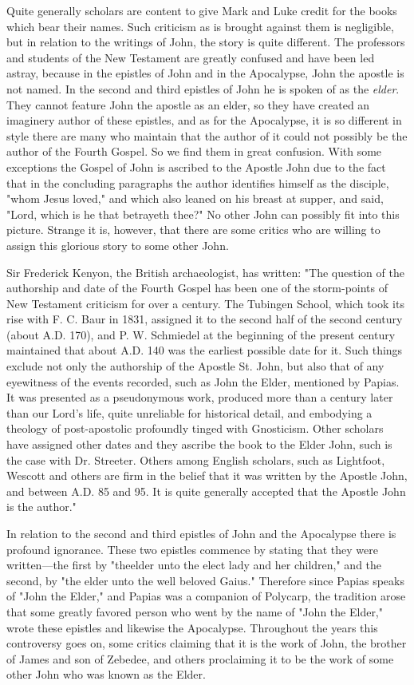 Quite generally scholars are content to give Mark and Luke credit for the books which bear
their names. Such criticism as is brought against them is negligible, but in relation to the
writings of John, the story is quite different. The professors and students of the New
Testament are greatly confused and have been led astray, because in the epistles of John and
in the Apocalypse, John the apostle is not named. In the second and third epistles of John he
is spoken of as the \textit{elder}. They cannot feature John the apostle as an elder, so they have
created an imaginery author of these epistles, and as for the Apocalypse, it is so different in
style there are many who maintain that the author of it could not possibly be the author of the
Fourth Gospel. So we find them in great confusion. With some exceptions the Gospel of John
is ascribed to the Apostle John due to the fact that in the concluding paragraphs the author
identifies himself as the disciple, "whom Jesus loved," and which also leaned on his breast at
supper, and said, "Lord, which is he that betrayeth thee?" No other John can possibly fit into
this picture. Strange it is, however, that there are some critics who are willing to assign this
glorious story to some other John.

Sir Frederick Kenyon, the British archaeologist, has written: "The question of the authorship
and date of the Fourth Gospel has been one of the storm-points of New Testament criticism
for over a century. The Tubingen School, which took its rise with F. C. Baur in 1831,
assigned it to the second half of the second century (about A.D. 170), and P. W. Schmiedel at
the beginning of the present century maintained that about A.D. 140 was the earliest possible
date for it. Such things exclude not only the authorship of the Apostle St. John, but also that
of any eyewitness of the events recorded, such as John the Elder, mentioned by Papias. It was
presented as a pseudonymous work, produced more than a century later than our Lord's life,
quite unreliable for historical detail, and embodying a theology of post-apostolic profoundly
tinged with Gnosticism. Other scholars have assigned other dates and they ascribe the book
to the Elder John, such is the case with Dr. Streeter. Others among English scholars, such as
Lightfoot, Wescott and others are firm in the belief that it was written by the Apostle John,
and between A.D. 85 and 95. It is quite generally accepted that the Apostle John is the
author."

In relation to the second and third epistles of John and the Apocalypse there is profound
ignorance. These two epistles commence by stating that they were written—the first by "theelder unto the elect lady and her children," and the second, by "the elder unto the well
beloved Gaius." Therefore since Papias speaks of "John the Elder," and Papias was a
companion of Polycarp, the tradition arose that some greatly favored person who went by the
name of "John the Elder," wrote these epistles and likewise the Apocalypse. Throughout the
years this controversy goes on, some critics claiming that it is the work of John, the brother
of James and son of Zebedee, and others proclaiming it to be the work of some other John
who was known as the Elder.

